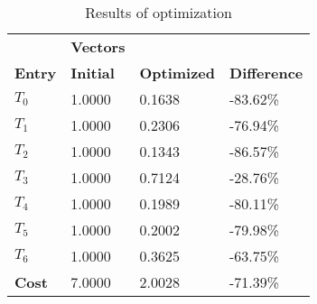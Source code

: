 \begin{table}[h!]
\centering
\begin{tabular}{llll}
\textbf{}      & \cellcolor[HTML]{EFEFEF}\textbf{Vectors} & \textbf{} & \textbf{}         \\
\rowcolor[HTML]{EFEFEF} 
\textbf{Entry} & \textbf{Initial} & \textbf{Optimized} & \textbf{Difference} \\
$T_0$ & 1.0000 & 0.1638 & -83.62\% \\ 
$T_1$ & 1.0000 & 0.2306 & -76.94\% \\ 
$T_2$ & 1.0000 & 0.1343 & -86.57\% \\ 
$T_3$ & 1.0000 & 0.7124 & -28.76\% \\ 
$T_4$ & 1.0000 & 0.1989 & -80.11\% \\ 
$T_5$ & 1.0000 & 0.2002 & -79.98\% \\ 
$T_6$ & 1.0000 & 0.3625 & -63.75\% \\ 
\rowcolor[HTML]{EFEFEF} 
\textbf{Cost}  & 7.0000 & 2.0028 & -71.39\% \\ 
\end{tabular}
\caption{Results of optimization}
\label{tab:OptimizationAnalysis}
\end{table}